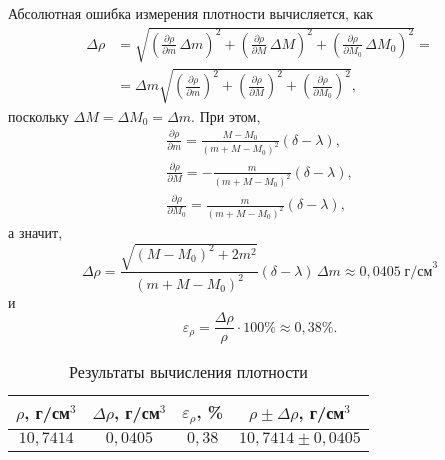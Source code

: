 Абсолютная ошибка измерения плотности вычисляется, как
\[
\begin{split}
	\Delta\rho & =\sqrt{\left(\frac{\partial\rho}{\partial m}\,\Delta m\right)^2+\left(\frac{\partial\rho}{\partial M}\,\Delta M\right)^2+\left(\frac{\partial\rho}{\partial M_0}\,\Delta M_0\right)^2}= \\
	& =\Delta m\sqrt{\left(\frac{\partial\rho}{\partial m}\right)^2+\left(\frac{\partial\rho}{\partial M}\right)^2+\left(\frac{\partial\rho}{\partial M_0}\right)^2},
\end{split}
\]
поскольку $\Delta M=\Delta M_0=\Delta m$. При этом,
\begin{gather*}
\frac{\partial\rho}{\partial m}=\frac{M-M_0}{(m+M-M_0)^2}(\delta-\lambda), \\
\frac{\partial\rho}{\partial M}=-\frac{m}{(m+M-M_0)^2}(\delta-\lambda), \\
\frac{\partial\rho}{\partial M_0}=\frac{m}{(m+M-M_0)^2}(\delta-\lambda),
\end{gather*}
а значит,
\[
\Delta\rho=\frac{\sqrt{(M-M_0)^2+2m^2}}{(m+M-M_0)^2}(\delta-\lambda)\,\Delta m\approx0{,}0405\;\text{г/см}^3
\]
и
\[
\varepsilon_\rho=\frac{\Delta\rho}{\rho}\cdot100\%\approx0{,}38\%.
\]

\begin{table}[h!]
	\begin{center}
	\begin{tabular}{|c|c|c|c|}
		\hline
		$\rho$, г/см$^3$ & $\Delta\rho$, г/см$^3$ & $\varepsilon_\rho$, \% & $\rho\pm\Delta\rho$, г/см$^3$ \\
		\hline
		$10{,}7414$ & $0{,}0405$ & $0{,}38$ & $10{,}7414\pm0{,}0405$ \\
		\hline
	\end{tabular}
	\caption{Результаты вычисления плотности}\label{TbTwo}
	\end{center}
\end{table}